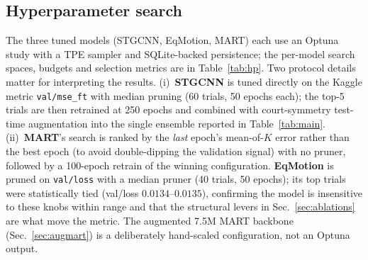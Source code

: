\documentclass{article} %
\begin{document}
\subsection{Hyperparameter search}
\label{sec:hp}
The three tuned models (STGCNN, EqMotion, MART) each use an Optuna study with a
TPE sampler and SQLite-backed persistence; the per-model search spaces, budgets
and selection metrics are in Table~\ref{tab:hp}. Two protocol details matter for
interpreting the results. (i)~\textbf{STGCNN} is tuned directly on the Kaggle
metric \texttt{val/mse\_ft} with median pruning (60 trials, 50 epochs each); the
top-5 trials are then retrained at 250 epochs and combined with court-symmetry
test-time augmentation into the single ensemble reported in
Table~\ref{tab:main}. (ii)~\textbf{MART}'s search is ranked by the \emph{last}
epoch's mean-of-$K$ error rather than the best epoch (to avoid double-dipping the
validation signal) with no pruner, followed by a 100-epoch retrain of the
winning configuration. \textbf{EqMotion} is pruned on \texttt{val/loss} with a
median pruner (40 trials, 50 epochs); its top trials were statistically tied
(val/loss $0.0134$--$0.0135$), confirming the model is insensitive to these
knobs within range and that the structural levers in Sec.~\ref{sec:ablations}
are what move the metric. The augmented 7.5M MART backbone
(Sec.~\ref{sec:augmart}) is a deliberately hand-scaled configuration, not an
Optuna output.
\end{document}
